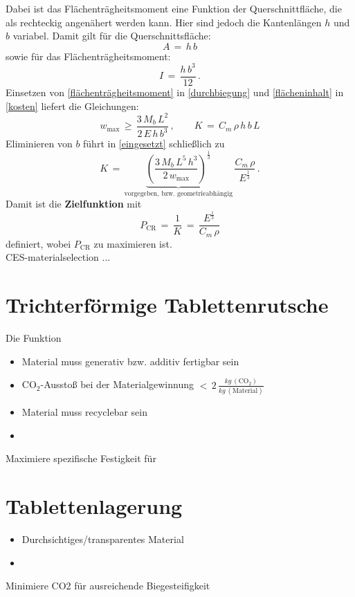 Dabei ist das Flächenträgheitsmoment eine Funktion der Querschnittfläche, die als rechteckig angenähert werden kann. Hier sind jedoch die Kantenlängen $h$ und $b$ variabel. Damit gilt für die Querschnittsfläche:
\begin{equation} \label{flächeninhalt}
A\,=\,h\,b
\end{equation}
sowie für das Flächenträgheitsmoment:
\begin{equation} \label{flächenträgheitsmoment}
I\,=\,\frac{h\,b^3}{12}\,.
\end{equation}
Einsetzen von \ref{flächenträgheitsmoment} in \ref{durchbiegung} und \ref{flächeninhalt} in \ref{kosten} liefert die Gleichungen:
\begin{equation} \label{eingesetzt}
	w_{\text{max}}\,\ge\,\frac{3\,M_b \,L^2}{2\,E\,h\,b^3}\,, \qquad
	K\,=\,C_m\,\rho\,h\,b\,L
\end{equation}
Eliminieren von $b$ führt in \ref{eingesetzt} schließlich zu
\begin{equation}\label{performance}
K\,=\,\underbrace{\left(\frac{3\,M_b\,L^5\,h^3}{2\,w_{\text{max}}}\right)^{\frac{1}{3}}}_\text{vorgegeben, bzw. geometrieabhängig}\,\frac{C_m\,\rho}{E^{\frac{1}{3}}}\,.
\end{equation}
Damit ist die \textbf{Zielfunktion} mit
\begin{equation} \label{zielfkt}
P_{\text{CR}}\,=\,\frac{1}{K}\,=\,\frac{E^\frac{1}{3}}{C_m\,\rho}
\end{equation}
definiert, wobei $P_{\text{CR}}$ zu maximieren ist.\\
CES-materialselection ...\\

\section{Trichterförmige Tablettenrutsche}
Die Funktion

\begin{itemize}
	\item Material muss generativ bzw. additiv fertigbar sein
	\item CO$_2$-Ausstoß bei der Materialgewinnung $<\,2\,\frac{kg\,(\text{CO}_2)}{kg\,(\text{Material})}$
	\item Material muss recyclebar sein
	\item 
\end{itemize}
Maximiere spezifische Festigkeit für 

\section{Tablettenlagerung}
\begin{itemize}
	\item Durchsichtiges/transparentes Material
	\item 
\end{itemize}
Minimiere CO2 für ausreichende Biegesteifigkeit